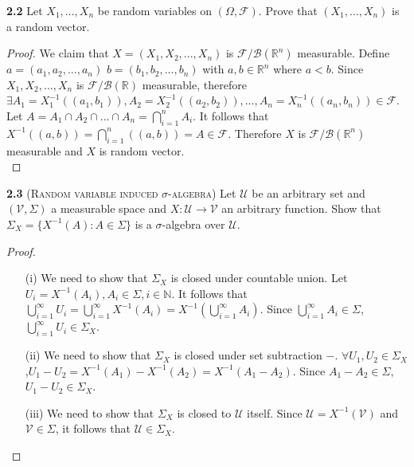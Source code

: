
\noindent\textbf{2.2} 
Let $X_1,\dots,X_n$ be random variables on $(\Omega, \mathcal{F})$. Prove that $( X_1 ,\dots,X_n )$ is a
random vector.
\begin{proof}
    We claim that $X=(X_1,X_2,...,X_n)$ is $\mathcal{F}/\mathcal{B}(\mathbb{R}^n)$ measurable. Define $a=(a_1,a_2,...,a_n)$ $b=(b_1,b_2,...,b_n)$ with $a,b\in \mathbb{R}^n$ where $a<b$. Since $X_1,X_2,...,X_n$ is $\mathcal{F}/\mathcal{B}(\mathbb{R})$ measurable, therefore $\exists A_1=X^{-1}_1((a_1,b_1)),A_2=X^{-1}_2((a_2,b_2)),...,A_n=X^{-1}_n((a_n,b_n))\in \mathcal{F}$. Let $A=A_1\cap A_2 \cap...\cap A_n=\bigcap\limits^{n}_{i=1}A_i$. It follows that $X^{-1}((a,b))=\bigcap\limits^{n}_{i=1}((a,b))=A\in \mathcal{F}$. Therefore $X$ is $\mathcal{F}/\mathcal{B}(\mathbb{R}^n)$ measurable and $X$ is random vector. \\

\end{proof}


\noindent\textbf{2.3}
(\textsc{Random variable induced $\sigma$-algebra}) Let $\mathcal{U}$ be an arbitrary set and
$( \mathcal{V}, \Sigma)$ a measurable space and $X : \mathcal{U} \rightarrow \mathcal{V}$ an arbitrary function. Show that
$\Sigma_X = \{X ^{-1} (A) : A \in \Sigma\}$ is a $\sigma$-algebra over $\mathcal{U}$.

\begin{proof}
    \begin{enumerate}
        \item[(i)] We need to show that $\Sigma_X$ is closed under countable union. Let $U_i=X^{-1}(A_i),A_i\in \Sigma, i\in \mathbb{N}$. It follows that $\bigcup\limits^{\infty}_{i=1}U_i=\bigcup\limits^{\infty}_{i=1}X^{-1}(A_i)=X^{-1}(\bigcup\limits^{\infty}_{i=1}A_i)$. Since $\bigcup\limits^{\infty}_{i=1}A_i\in \Sigma$, $\bigcup\limits^{\infty}_{i=1}U_i\in \Sigma_X$.
        \item[(ii)] We need to show that $\Sigma_X$ is closed under set subtraction $-$. $\forall U_1,U_2\in \Sigma_X$,$U_1-U_2=X^{-1}(A_1)-X^{-1}(A_2)=X^{-1}(A_1-A_2)$. Since $A_1-A_2\in \Sigma$, $U_1-U_2\in \Sigma_X$.
        \item[(iii)] We need to show that $\Sigma_X$ is closed to $\mathcal{U}$ itself. Since $\mathcal{U}=X^{-1}(\mathcal{V})$ and $\mathcal{V}\in \Sigma$, it follows that $\mathcal{U}\in \Sigma_X$.
        \end{enumerate}
\end{proof}



